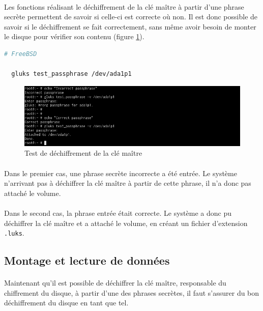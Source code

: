 \paragraph{}
Les fonctions réalisant le déchiffrement de la clé maître à partir d'une phrase
secrète permettent de savoir si celle-ci est correcte où non. Il est donc
possible de savoir si le déchiffrement se fait correctement, sans même avoir
besoin de monter le disque pour vérifier son contenu (figure
\ref{fig:freebsd_test_passphrase}).
\\
\begin{lstlisting}[language=bash]
  # FreeBSD

  gluks test_passphrase /dev/ada1p1
\end{lstlisting}
\begin{figure}[H]
  \centering
  \includegraphics[width=\linewidth]{tests/freebsd_test_passphrase.png}
  \caption{\label{fig:freebsd_test_passphrase}Test de déchiffrement de la clé maître}
\end{figure}
\paragraph{}
Dans le premier cas, une phrase secrète incorrecte a été entrée. Le système
n'arrivant pas à déchiffrer la clé maître à partir de cette phrase, il n'a donc
pas attaché le volume.
\paragraph{}
Dans le second cas, la phrase entrée était correcte. Le système a donc pu
déchiffrer la clé maître et a attaché le volume, en créant un fichier
d'extension \texttt{.luks}.

\subsection{Montage et lecture de données}
\paragraph{}
Maintenant qu'il est possible de déchiffrer la clé maître, responsable du
chiffrement du disque, à partir d'une des phrases secrètes, il faut s'assurer du
bon déchiffrement du disque en tant que tel.
